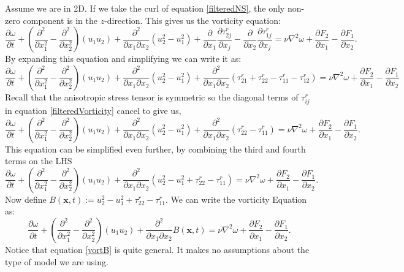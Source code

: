 \documentclass[11pt,a4paper]{article}
\begin{document}
Assume we are in 2D. If we take the curl of equation \ref{filteredNS}, the only non-zero component is in the $z$-direction. This gives us the vorticity equation:
$$\frac{\partial \omega}{\partial t}  + \left(\frac{\partial^2}{\partial x_1^2} - \frac{\partial^2}{\partial x_2^2}\right)(u_1u_2) +\frac{\partial^2}{\partial x_1\partial x_2}\left(u_2^2-u_1^2\right)+ \frac{\partial }{\partial x_1}\frac{\partial \tau_{2j}^r}{\partial x_j} - \frac{\partial }{\partial x_2}\frac{\partial \tau_{1j}^r}{\partial x_j}= \nu{\nabla}^2\omega+\frac{\partial F_2}{\partial x_1} - \frac{\partial F_1}{\partial x_2}.$$
By expanding this equation and simplifying we can write it as:
\begin{equation}\label{filteredVorticity}
\frac{\partial \omega}{\partial t}  + \left(\frac{\partial^2}{\partial x_1^2} - \frac{\partial^2}{\partial x_2^2}\right)(u_1u_2) +\frac{\partial^2}{\partial x_1\partial x_2}\left(u_2^2-u_1^2\right)+ \frac{\partial^2 }{\partial x_1\partial x_2}\left( \tau_{21}^r+\tau_{22}^r-  \tau_{11}^r-\tau_{12}^r\right)= \nu{\nabla}^2\omega+\frac{\partial F_2}{\partial x_1} - \frac{\partial F_1}{\partial x_2}
\end{equation}
Recall that the anisotropic stress tensor is symmetric so the diagonal terms of $\tau_{ij}^r$ in equation \ref{filteredVorticity} cancel to give us,
$$\frac{\partial \omega}{\partial t}  + \left(\frac{\partial^2}{\partial x_1^2} - \frac{\partial^2}{\partial x_2^2}\right)(u_1u_2) +\frac{\partial^2}{\partial x_1\partial x_2}\left(u_2^2-u_1^2\right)+ \frac{\partial^2 }{\partial x_1\partial x_2}\left( \tau_{22}^r-  \tau_{11}^r\right)= \nu{\nabla}^2\omega+\frac{\partial F_2}{\partial x_1} - \frac{\partial F_1}{\partial x_2}.$$
This equation can be simplified even further, by combining the third and fourth terms on the LHS
$$\frac{\partial \omega}{\partial t}  + \left(\frac{\partial^2}{\partial x_1^2} - \frac{\partial^2}{\partial x_2^2}\right)(u_1u_2) +\frac{\partial^2}{\partial x_1\partial x_2}\left(u_2^2-u_1^2 + \tau_{22}^r-  \tau_{11}^r\right)= \nu{\nabla}^2\omega+\frac{\partial F_2}{\partial x_1} - \frac{\partial F_1}{\partial x_2}.$$
Now define $B(\boldsymbol{x}, t) :=u_2^2-u_1^2+ \tau_{22}^r - \tau_{11}^r$. We can write the vorticity Equation as:
\begin{equation}\label{vortB}
\frac{\partial \omega}{\partial t}  + \left(\frac{\partial^2}{\partial x_1^2} - \frac{\partial^2}{\partial x_2^2}\right)(u_1u_2) + \frac{\partial^2 }{\partial x_1\partial x_2}B(\boldsymbol{x}, t)= \nu{\nabla}^2\omega+\frac{\partial F_2}{\partial x_1} - \frac{\partial F_1}{\partial x_2} .
\end{equation}
Notice that equation \ref{vortB} is quite general. It makes no assumptions about the type of model we are using. 
\end{document}
